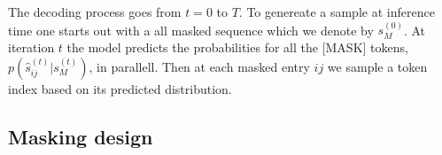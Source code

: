 \documentclass[../../thesis.tex]{subfiles}
\begin{document}
The decoding process goes from $t = 0$ to $T$. To genereate a sample at inference time one starts out with a all masked sequence which we denote by $s_M^{(0)}$. At iteration $t$ the model predicts the probabilities for all the [MASK] tokens, $p(\hat{s}_{ij}^{(t)}|s_M^{(t)})$, in parallell. Then at each masked entry $ij$ we sample a token index based on its predicted distribution.  

\subsection{Masking design}
\end{document}
